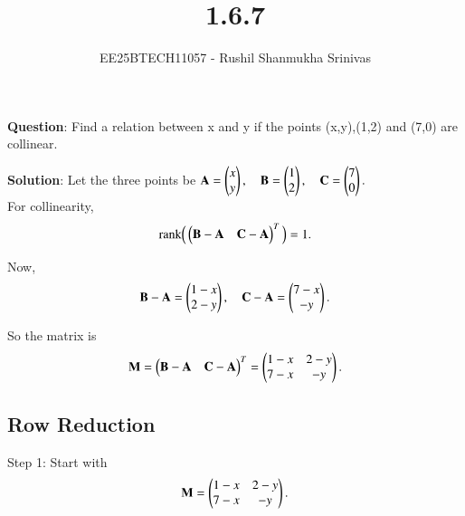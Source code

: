 \documentclass[journal]{IEEEtran}
\begin{document}




\title{1.6.7}
\author{EE25BTECH11057 - Rushil Shanmukha Srinivas
}
{\let\newpage\relax\maketitle}

\renewcommand{\thefigure}{\theenumi}
\renewcommand{\thetable}{\theenumi}
\setlength{\intextsep}{10pt} %

\renewcommand{\thetable}{\theenumi}

\textbf{Question}: Find a relation between x and y if the points (x,y),(1,2) and (7,0) are collinear.

\textbf{Solution}:
Let the three points be
$
\vec{A}=\myvec {x \\ y} ,\quad
\vec{B}=\myvec {1 \\ 2} , \quad 
\vec{C}=\myvec {7 \\ 0}.
$
\\

For collinearity, 
\begin{align}
\operatorname{rank}\!\Big( \myvec {\vec{B}-\vec{A} & \vec{C}-\vec{A} }^T \Big) = 1.
\end{align}

Now,
\begin{align}
\vec{B}-\vec{A} = \myvec{1-x \\ 2-y} , \quad
\vec{C}-\vec{A} = \myvec{7-x \\ -y}.
\end{align}

So the matrix is
\begin{align}
\vec{M} = \myvec {\vec{B}-\vec{A} & \vec{C}-\vec{A} }^T
= \myvec{
1-x & 2-y \\
7-x & -y}.
\end{align}
\subsection*{Row Reduction}

Step 1: Start with
\begin{align}
\vec{M} = \myvec
{1-x & 2-y \\
7-x & -y}.
\end{align}
\end{document}
